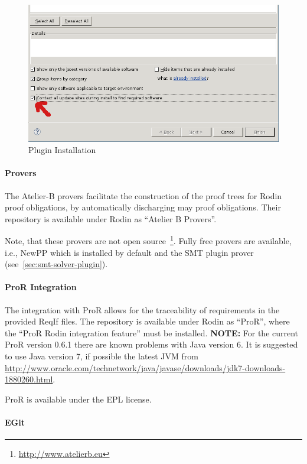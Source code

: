 \documentclass[10pt,a4paper]{article}
\begin{document}
\begin{figure}[ht]
  \centering
  \includegraphics[width=.75\textwidth]{install-plugin}
  \caption{Plugin Installation}
  \label{fig:plugin-install}
\end{figure}

\paragraph{Provers}
\label{sec:atelier-b-provers}

The Atelier-B provers facilitate the construction of the proof trees for Rodin
proof obligations, by automatically discharging may proof obligations. Their
repository is available under Rodin as ``Atelier B Provers''.

Note, that these provers are not open source~\footnote{\url{
    http://www.atelierb.eu}}. Fully free provers are available, i.e., NewPP
which is installed by default and the SMT plugin prover
(see~\ref{sec:smt-solver-plugin}).

\paragraph{ProR Integration}
\label{sec:pror-integration}

The integration with ProR allows for the traceability of requirements in the
provided ReqIf files. The repository is available under Rodin as ``ProR'', where
the ``ProR Rodin integration feature'' must be installed. {\bf NOTE: } For the
current ProR version 0.6.1 there are known problems with Java version 6. It is
suggested to use Java version 7, if possible the latest JVM from
\url{http://www.oracle.com/technetwork/java/javase/downloads/jdk7-downloads-1880260.html}.

ProR is available under the EPL license.

\paragraph{EGit}
\label{sec:egit}
\end{document}
